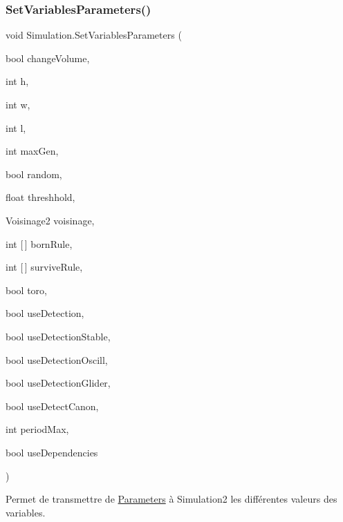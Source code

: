\subsubsection{\texorpdfstring{Set\+Variables\+Parameters()}{SetVariablesParameters()}}
{\footnotesize\ttfamily void Simulation.\+Set\+Variables\+Parameters (\begin{DoxyParamCaption}\item[{bool}]{change\+Volume,  }\item[{int}]{h,  }\item[{int}]{w,  }\item[{int}]{l,  }\item[{int}]{max\+Gen,  }\item[{bool}]{random,  }\item[{float}]{threshhold,  }\item[{Voisinage2}]{voisinage,  }\item[{int \mbox{[}$\,$\mbox{]}}]{born\+Rule,  }\item[{int \mbox{[}$\,$\mbox{]}}]{survive\+Rule,  }\item[{bool}]{toro,  }\item[{bool}]{use\+Detection,  }\item[{bool}]{use\+Detection\+Stable,  }\item[{bool}]{use\+Detection\+Oscill,  }\item[{bool}]{use\+Detection\+Glider,  }\item[{bool}]{use\+Detect\+Canon,  }\item[{int}]{period\+Max,  }\item[{bool}]{use\+Dependencies }\end{DoxyParamCaption})\hspace{0.3cm}{\ttfamily [inline]}}



Permet de transmettre de \mbox{\hyperlink{class_parameters}{Parameters}} à Simulation2 les différentes valeurs des variables. 

